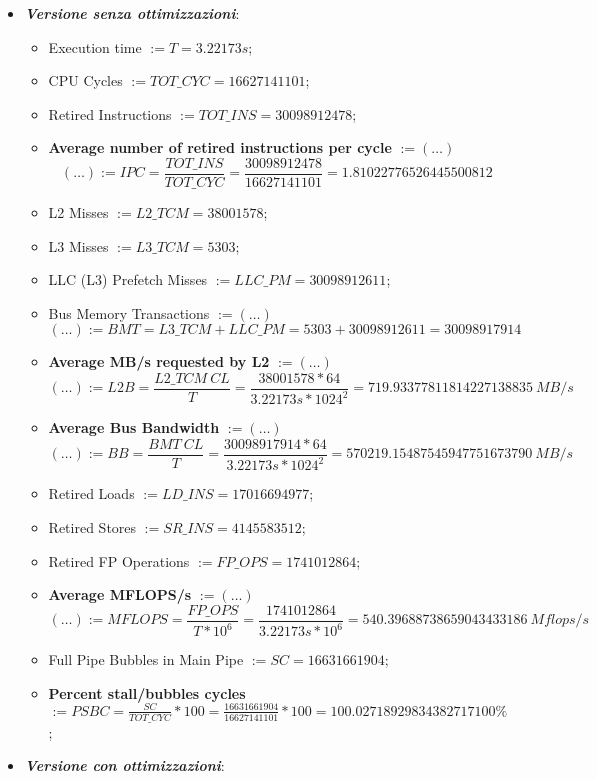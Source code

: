 \begin{itemize}

\item{\textbf{\textit{Versione senza ottimizzazioni}}}:

\begin{itemize}
\item{Execution time} $:= T = 3.22173s$;
\item{CPU Cycles} $:= TOT\_CYC = 16627141101$;
\item{Retired Instructions} $:= TOT\_INS = 30098912478$;
\item{\textbf{Average number of retired instructions per cycle}} $:= (\dots)$
\[
	(\dots) := IPC = \frac{TOT\_INS}{TOT\_CYC} = \frac{30098912478}{16627141101} = 1.81022776526445500812
\]
\item{L2 Misses} $:= L2\_TCM = 38001578$;
\item{L3 Misses} $:= L3\_TCM = 5303$;
\item{LLC (L3) Prefetch Misses} $:= LLC\_PM = 30098912611$;
\item{Bus Memory Transactions} $:= (\dots)$
\[
	(\dots) := BMT = L3\_TCM+LLC\_PM = 5303+30098912611 = 30098917914
\]
\item{\textbf{Average MB/s requested by L2}} $:= (\dots)$
\[
	(\dots) := L2B = \frac{L2\_TCM\ CL}{T} = \frac{38001578*64}{3.22173s*1024^2} = 719.93377811814227138835\ MB/s
\]
\item{\textbf{Average Bus Bandwidth}} $:= (\dots)$
\[
	(\dots) := BB = \frac{BMT\ CL}{T} = \frac{30098917914*64}{3.22173s*1024^2} = 570219.15487545947751673790\ MB/s
\]
\item{Retired Loads} $:= LD\_INS = 17016694977$;
\item{Retired Stores} $:= SR\_INS = 4145583512$;
\item{Retired FP Operations} $:= FP\_OPS = 1741012864$;
\item{\textbf{Average MFLOPS/s}} $:= (\dots)$
\[
	(\dots) := MFLOPS = \frac{FP\_OPS}{T*10^6} = \frac{1741012864}{3.22173s*10^6} = 540.39688738659043433186\ Mflops/s
\]
\item{Full Pipe Bubbles in Main Pipe} $:= SC = 16631661904$;
\item{\textbf{Percent stall/bubbles cycles}} $:= PSBC = \frac{SC}{TOT\_CYC}*100 = \frac{16631661904}{16627141101}*100 = 100.02718929834382717100\%$;
\end{itemize}

\item{\textbf{\textit{Versione con ottimizzazioni}}}:


\end{itemize}
